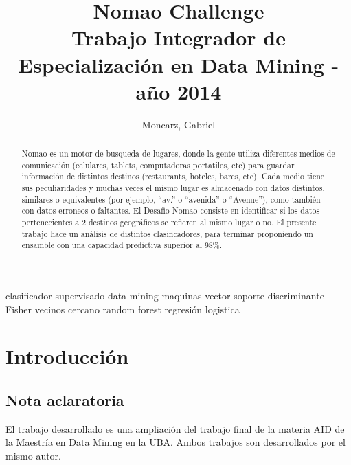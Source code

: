 \documentclass[journal]{IEEEtran}
\begin{document}
\title{  Nomao Challenge \\
	{\large Trabajo Integrador de Especialización en Data Mining - año 2014} \\
} 
\author{Moncarz, Gabriel}
\maketitle %


\begin{abstract}
Nomao es un motor de busqueda de lugares, donde la gente utiliza diferentes medios
de comunicación (celulares, tablets, computadoras portatiles, etc) 
para guardar información de distintos destinos (restaurants, hoteles,
bares, etc). Cada medio tiene sus peculiaridades y muchas veces el mismo lugar
es almacenado con datos distintos, similares o equivalentes (por ejemplo, ``av.'' o
``avenida'' o ``Avenue''), como también con datos erroneos o faltantes. 
El Desafio Nomao consiste en identificar si los datos pertenecientes
a 2 destinos geográficos se refieren al mismo lugar o no. El presente
trabajo hace un análisis de distintos clasificadores, para terminar
proponiendo un ensamble con una capacidad predictiva superior al 98\%.
\end{abstract}

\begin{IEEEkeywords}
clasificador supervisado data mining maquinas vector soporte
discriminante Fisher vecinos cercano random forest
regresión logistica
\end{IEEEkeywords}


\section{Introducción}

\subsection{Nota aclaratoria}
El trabajo desarrollado es una ampliación del trabajo final de la materia
AID de la Maestría en Data Mining en la UBA. 
Ambos trabajos son desarrollados por el mismo autor.
\end{document}
